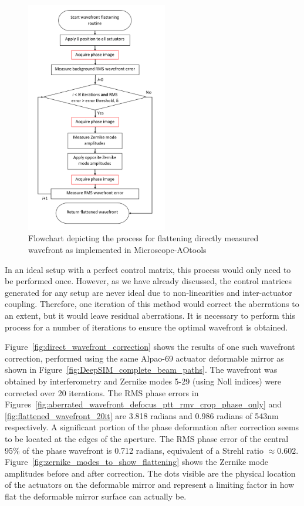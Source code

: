 \begin{figure}[h]
	\centering
	\includegraphics[width=0.55\textwidth, scale=0.5]{./images/direct_wavefront_flattening_workflow.png}
	\caption{Flowchart depicting the process for flattening directly measured wavefront as implemented in Microscope-AOtools}
	\label{fig:direct_wavefront_flattening_workflow}
\end{figure}

In an ideal setup with a perfect control matrix, this process would only need to be performed once. However, as we have already discussed, the control matrices generated for any setup are never ideal due to non-linearities and inter-actuator coupling. Therefore, one iteration of this method would correct the aberrations to an extent, but it would leave residual aberrations. It is necessary to perform this process for a number of iterations to ensure the optimal wavefront is obtained. 

Figure~\ref{fig:direct_wavefront_correction} shows the results of one such wavefront correction, performed using the same Alpao-69 actuator deformable mirror as shown in Figure~\ref{fig:DeepSIM_complete_beam_paths}. The wavefront was 
obtained by interferometry and Zernike modes 5-29 (using Noll indices) were corrected over 20 iterations. The RMS phase errors in Figures~\ref{fig:aberrated_wavefront_defocus_ptt_rmv_crop_phase_only} and \ref{fig:flattened_wavefront_20it} are 3.818 radians and 0.986 radians of 543nm respectively. A significant portion of the phase deformation after correction seems to be located at the edges of the aperture. The RMS phase error of the central 95\% of the phase wavefront is 0.712 radians, equivalent of a Strehl ratio $\approx 0.602$. Figure~\ref{fig:zernike_modes_to_show_flattening}
shows the Zernike mode amplitudes before and after correction. The dots visible are the physical location of the actuators on the deformable mirror and represent a limiting factor in how flat the deformable mirror surface can actually be. 

